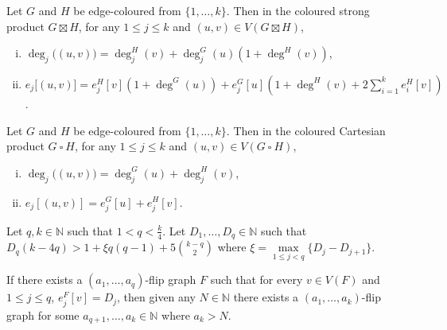 \documentclass[10pt,a4paper]{amsart}
\begin{document}
\begin{lemma}\label{SPColourLemma}
	Let $G$ and $H$ be edge-coloured from $\{1, \dots, k\}$. Then in the coloured strong product $G \boxtimes H$, for any $1 \leq j \leq k$ and $(u, v) \in V(G \boxtimes H)$,
	\begin{enumerate}[i.]
		\item $\deg_j \big((u,v)\big) = \deg_j^H (v) + \deg_j^G (u) \left(1 + \deg^H (v)\right)$,
		\item $e_j \big[(u, v)\big] = e_j^H [v] \left(1 + \deg^G (u)\right) + e_j^G [u] \left(1 + \deg^H (v) + 2\sum\limits_{i = 1}^k e_i^H [v]\right)$.
	\end{enumerate}
\end{lemma}

\begin{lemma}\label{CPColourLemma}
	Let $G$ and $H$ be edge-coloured from $\{1, \dots, k\}$. Then in the coloured Cartesian product $G \ \square \ H$, for any $1 \leq j \leq k$ and $(u, v) \in V(G \ \square \ H)$,
	\begin{enumerate}[i.]
		\item $\deg_j \big((u,v)\big) = \deg_j^G (u) + \deg_j^H (v)$,
		\item $e_j\left[(u,v)\right] = e_j^G[u] + e_j^H[v]$.
	\end{enumerate}
\end{lemma}

\begin{lemma} \label{GapsProp}
	Let $q, k \in \mathbb{N}$ such that $1 < q < \frac{k}{4}$. Let $D_1, \dots, D_q \in \mathbb{N}$ such that $D_q (k - 4q) > 1 + \xi q(q-1) + 5\binom{k-q}{2}$ where $\xi = \max\limits_{1 \leq j < q}\{D_j - D_{j+1}\}$. 
	
	If there exists a $(a_1, \dots, a_q)$-flip graph $F$ such that for every $v \in V(F)$ and $1 \leq j \leq q$, $e_j^F [v] = D_j$, then given any $N \in \mathbb{N}$ there exists a $(a_1, \dots, a_k)$-flip graph for some $a_{q+1}, \dots, a_k \in \mathbb{N}$ where $a_k > N$.
\end{lemma}
\end{document}
